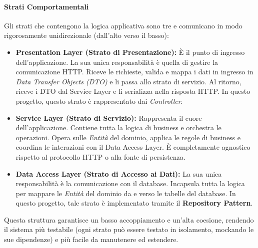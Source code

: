 \documentclass[12pt,a4paper,openright,twoside]{book}
\begin{document}
\paragraph{Strati Comportamentali}
Gli strati che contengono la logica applicativa sono tre e comunicano in modo rigorosamente unidirezionale (dall'alto verso il basso):

\begin{itemize}
    \item \textbf{Presentation Layer (Strato di Presentazione):} È il punto di ingresso dell'applicazione. La sua unica responsabilità è quella di gestire la comunicazione HTTP. Riceve le richieste, valida e mappa i dati in ingresso in \textit{Data Transfer Objects (DTO)} e li passa allo strato di servizio. Al ritorno, riceve i DTO dal Service Layer e li serializza nella risposta HTTP. In questo progetto, questo strato è rappresentato dai \textit{Controller}.

    \item \textbf{Service Layer (Strato di Servizio):} Rappresenta il cuore dell'applicazione. Contiene tutta la logica di business e orchestra le operazioni. Opera sulle \textit{Entità} del dominio, applica le regole di business e coordina le interazioni con il Data Access Layer. È completamente agnostico rispetto al protocollo HTTP o alla fonte di persistenza.

    \item \textbf{Data Access Layer (Strato di Accesso ai Dati):} La sua unica responsabilità è la comunicazione con il database. Incapsula tutta la logica per mappare le \textit{Entità} del dominio da e verso le tabelle del database. In questo progetto, tale strato è implementato tramite il \textbf{Repository Pattern}.
\end{itemize}

Questa struttura garantisce un basso accoppiamento e un'alta coesione, rendendo il sistema più testabile (ogni strato può essere testato in isolamento, mockando le sue dipendenze) e più facile da manutenere ed estendere.
\end{document}
